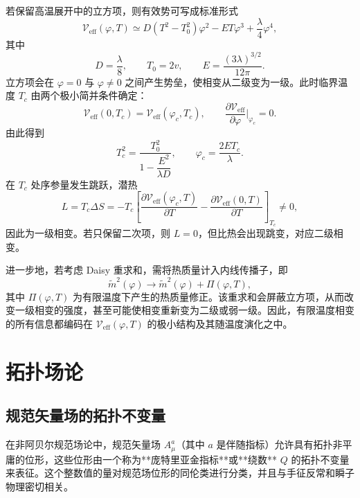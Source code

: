 若保留高温展开中的立方项，则有效势可写成标准形式
\begin{equation}
\mathscr V_{\mathrm{eff}}(\varphi,T)
\simeq
D(T^2-T_0^2)\varphi^2
-ET\varphi^3
+\frac{\lambda}{4}\varphi^4,
\end{equation}
其中
\begin{equation}
D=\frac{\lambda}{8},\qquad T_0=2v,\qquad
E=\frac{(3\lambda)^{3/2}}{12\pi}.
\end{equation}
立方项会在 \(\varphi=0\) 与 \(\varphi\neq0\) 之间产生势垒，使相变从二级变为一级。此时临界温度 \(T_c\) 由两个极小简并条件确定：
\begin{equation}
\mathscr V_{\mathrm{eff}}(0,T_c)=\mathscr V_{\mathrm{eff}}(\varphi_c,T_c),\qquad
\frac{\partial \mathscr V_{\mathrm{eff}}}{\partial \varphi}\Big|_{\varphi_c}=0.
\end{equation}
由此得到
\begin{equation}
T_c^2=\frac{T_0^2}{1-\dfrac{E^2}{\lambda D}},
\qquad
\varphi_c=\frac{2ET_c}{\lambda}.
\end{equation}
在 \(T_c\) 处序参量发生跳跃，潜热
\begin{equation}
L=T_c\Delta S
=
-T_c\left[
\frac{\partial \mathscr V_{\mathrm{eff}}(\varphi_c,T)}{\partial T}
-
\frac{\partial \mathscr V_{\mathrm{eff}}(0,T)}{\partial T}
\right]_{T_c}
\neq 0,
\end{equation}
因此为一级相变。若只保留二次项，则 \(L=0\)，但比热会出现跳变，对应二级相变。

进一步地，若考虑 Daisy 重求和，需将热质量计入内线传播子，即
\begin{equation}
\tilde m^2(\varphi)\to \tilde m^2(\varphi)+\Pi(\varphi,T),
\end{equation}
其中 \(\Pi(\varphi,T)\) 为有限温度下产生的热质量修正。该重求和会屏蔽立方项，从而改变一级相变的强度，甚至可能使相变重新变为二级或弱一级。因此，有限温度相变的所有信息都编码在 \(\mathscr V_{\mathrm{eff}}(\varphi,T)\) 的极小结构及其随温度演化之中。



\chapter{拓扑场论}


\section{规范矢量场的拓扑不变量}

在非阿贝尔规范场论中，规范矢量场 \(A_\mu^a\)（其中 \(a\) 是伴随指标）允许具有拓扑非平庸的位形，这些位形由一个称为**庞特里亚金指标**或**绕数** \(Q\) 的拓扑不变量来表征。这个整数值的量对规范场位形的同伦类进行分类，并且与手征反常和瞬子物理密切相关。

